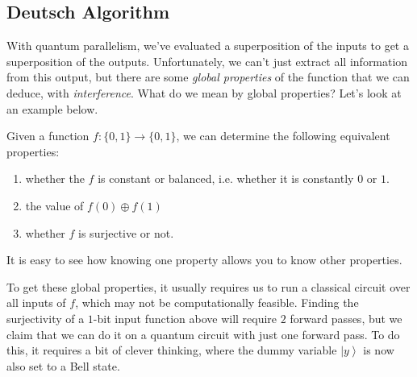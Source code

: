 \documentclass{article}
\newcommand{\ket}[1]{\ensuremath{\left|#1\right\rangle}}
\newcounter{example}[section]
\begin{document}
  \subsection{Deutsch Algorithm}

    With quantum parallelism, we've evaluated a superposition of the inputs to get a superposition of the outputs. Unfortunately, we can't just extract all information from this output, but there are some \textit{global properties} of the function that we can deduce, with \textit{interference}. What do we mean by global properties? Let's look at an example below. 

    \begin{example}
      \label{ex:1-bit-function}
      Given a function $f: \{0, 1\} \to \{0, 1\}$, we can determine the following equivalent properties: 
      \begin{enumerate} 
        \item whether the $f$ is constant or balanced, i.e. whether it is constantly $0$ or $1$.
        \item the value of $f(0) \oplus f(1)$
        \item whether $f$ is surjective or not. 
      \end{enumerate}
      It is easy to see how knowing one property allows you to know other properties. 
    \end{example}

    To get these global properties, it usually requires us to run a classical circuit over all inputs of $f$, which may not be computationally feasible. Finding the surjectivity of a $1$-bit input function above will require $2$ forward passes, but we claim that we can do it on a quantum circuit with just one forward pass. To do this, it requires a bit of clever thinking, where the dummy variable $\ket{y}$ is now also set to a Bell state. 
\end{document}
